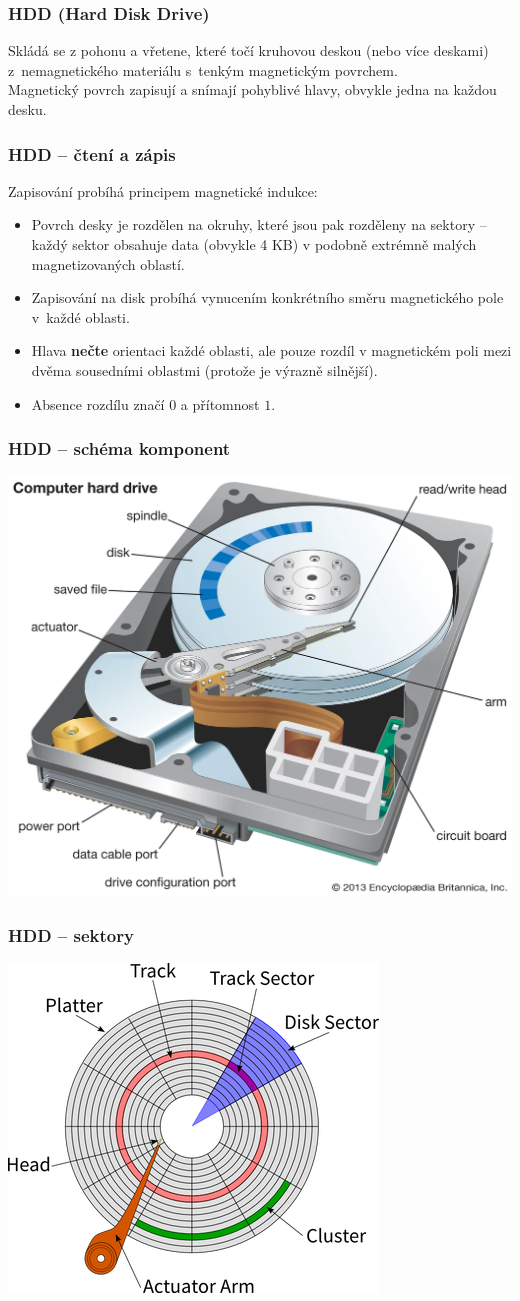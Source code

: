\documentclass[aspectratio=169,11pt,svgnames]{beamer}
\begin{document}
\begin{frame}
 \frametitle{HDD (\textbf{H}ard \textbf{D}isk \textbf{D}rive)}
 Skládá se z pohonu a vřetene, které točí kruhovou deskou (nebo více deskami)
 z~nemagnetického materiálu s~tenkým magnetickým povrchem.\\
 \pause
 Magnetický povrch zapisují a snímají pohyblivé hlavy, obvykle jedna na každou
 desku.
\end{frame}

\begin{frame}
 \frametitle{HDD -- čtení a zápis}
 Zapisování probíhá principem magnetické indukce:
 \begin{itemize}[label=\textbullet]
  \item Povrch desky je rozdělen na okruhy, které jsou pak rozděleny na sektory
   -- každý sektor obsahuje data (obvykle 4 KB) v podobně extrémně malých
   magnetizovaných oblastí.
  \pause
  \item Zapisování na disk probíhá vynucením konkrétního směru magnetického pole
   v~každé oblasti.
   \pause
  \item Hlava \textbf{nečte} orientaci každé oblasti, ale pouze rozdíl v
   magnetickém poli mezi dvěma sousedními oblastmi (protože je výrazně silnější).
  \pause
  \item Absence rozdílu značí $0$ a přítomnost $1$.
 \end{itemize}
\end{frame}

\begin{frame}
 \frametitle{HDD -- schéma komponent}
 \begin{center}
  \includegraphics[width=.5\textwidth]{hdd_big}
 \end{center}
\end{frame}

\begin{frame}
 \frametitle{HDD -- sektory}
 \begin{center}
  \includegraphics[width=.5\textwidth]{hdd_sector}
 \end{center}
\end{frame}
\end{document}
